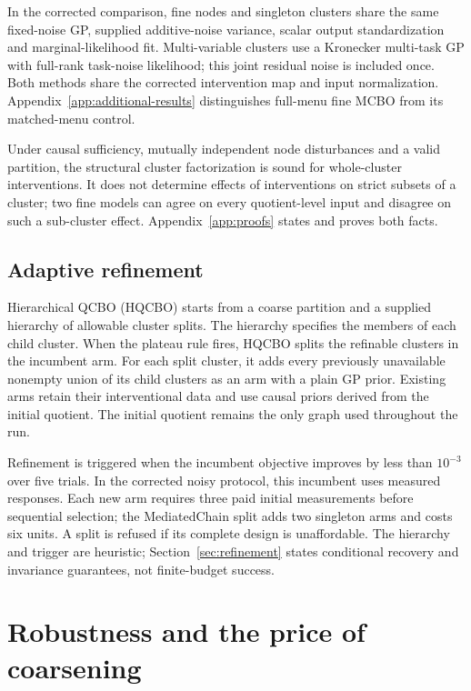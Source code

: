 \documentclass[twoside]{article}
\newcommand{\HQCBO}{\textsc{HQCBO}}
\begin{document}
In the corrected comparison, fine nodes and singleton clusters share the same fixed-noise GP, supplied additive-noise variance, scalar output standardization and marginal-likelihood fit. Multi-variable clusters use a Kronecker multi-task GP with full-rank task-noise likelihood; this joint residual noise is included once. Both methods share the corrected intervention map and input normalization. Appendix~\ref{app:additional-results} distinguishes full-menu fine MCBO from its matched-menu control.

Under causal sufficiency, mutually independent node disturbances and a valid partition, the structural cluster factorization is sound for whole-cluster interventions. It does not determine effects of interventions on strict subsets of a cluster; two fine models can agree on every quotient-level input and disagree on such a sub-cluster effect. Appendix~\ref{app:proofs} states and proves both facts.

\subsection{Adaptive refinement}
Hierarchical QCBO (\HQCBO{}) starts from a coarse partition and a
supplied hierarchy of allowable cluster splits. The hierarchy
specifies the members of each child cluster. When the plateau rule
fires, HQCBO splits the refinable clusters in the incumbent arm.
For each split cluster, it adds every previously unavailable
nonempty union of its child clusters as an arm with a plain GP prior.
Existing arms retain their interventional data and use causal priors
derived from the initial quotient. The initial quotient remains the
only graph used throughout the run.

Refinement is triggered when the incumbent objective improves by less than \(10^{-3}\) over five trials. In the corrected noisy protocol, this incumbent uses measured responses. Each new arm requires three paid initial measurements before sequential selection; the MediatedChain split adds two singleton arms and costs six units. A split is refused if its complete design is unaffordable. The hierarchy and trigger are heuristic; Section~\ref{sec:refinement} states conditional recovery and invariance guarantees, not finite-budget success.

\section{Robustness and the price of coarsening}
\label{sec:theory}
\end{document}
